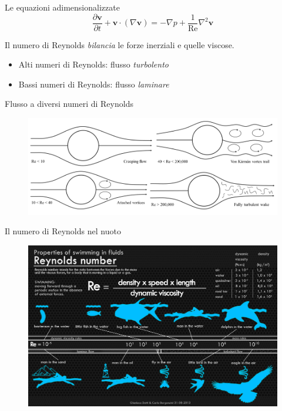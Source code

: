 \documentclass[11pt]{beamer}
\begin{document}
\begin{frame}{Le equazioni adimensionalizzate}
\begin{equation}
\frac{\partial \mathbf{v}}{\partial t} +\mathbf{v} \cdot (\nabla \mathbf{v}) = -\nabla p + \frac{1}{\text{Re}} \nabla^2 \mathbf{v}
\end{equation}

Il numero di Reynolds \emph{bilancia} le forze inerziali e quelle viscose.

\begin{itemize}
\item Alti numeri di Reynolds: flusso \emph{turbolento}
\item Bassi numeri di Reynolds: flusso \emph{laminare}
\end{itemize}
\end{frame}


\begin{frame}{Flusso a diversi numeri di Reynolds}
\begin{figure}
\centering
\includegraphics[scale=0.4]{flow_cylinder_6.png}
\end{figure}
\end{frame}

\begin{frame}{Il numero di Reynolds nel nuoto}
\begin{figure}
\centering
\includegraphics[scale=0.12]{infographic.jpg}
\end{figure}
\end{frame}
\end{document}
